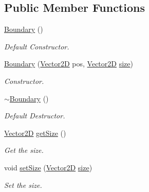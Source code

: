 \subsection*{Public Member Functions}
\begin{DoxyCompactItemize}
\item 
\mbox{\label{class_boundary_a7c4c8db45b13dab630e4c6ed7a958e71}} 
\mbox{\hyperlink{class_boundary_a7c4c8db45b13dab630e4c6ed7a958e71}{Boundary}} ()
\begin{DoxyCompactList}\small\item\em Default Constructor. \end{DoxyCompactList}\item 
\mbox{\hyperlink{class_boundary_a2b9f2570842c4216442993d67759a6c3}{Boundary}} (\mbox{\hyperlink{struct_vector2_d}{Vector2D}} pos, \mbox{\hyperlink{struct_vector2_d}{Vector2D}} \mbox{\hyperlink{class_boundary_aa4c4c5486e042d3e1fccc9e18815aebe}{size}})
\begin{DoxyCompactList}\small\item\em Constructor. \end{DoxyCompactList}\item 
\mbox{\label{class_boundary_a86eab4f2362618c5b1e3d0df3a5f7f42}} 
\mbox{\hyperlink{class_boundary_a86eab4f2362618c5b1e3d0df3a5f7f42}{$\sim$\+Boundary}} ()
\begin{DoxyCompactList}\small\item\em Default Destructor. \end{DoxyCompactList}\item 
\mbox{\label{class_boundary_aa4519902163bbce59e030eda0a5a8b0d}} 
\mbox{\hyperlink{struct_vector2_d}{Vector2D}} \mbox{\hyperlink{class_boundary_aa4519902163bbce59e030eda0a5a8b0d}{get\+Size}} ()
\begin{DoxyCompactList}\small\item\em Get the size. \end{DoxyCompactList}\item 
\mbox{\label{class_boundary_a11a67064804afa6ef9ddf053ed4a634c}} 
void \mbox{\hyperlink{class_boundary_a11a67064804afa6ef9ddf053ed4a634c}{set\+Size}} (\mbox{\hyperlink{struct_vector2_d}{Vector2D}} \mbox{\hyperlink{class_boundary_aa4c4c5486e042d3e1fccc9e18815aebe}{size}})
\begin{DoxyCompactList}\small\item\em Set the size. \end{DoxyCompactList}\item 

\end{DoxyCompactItemize}
